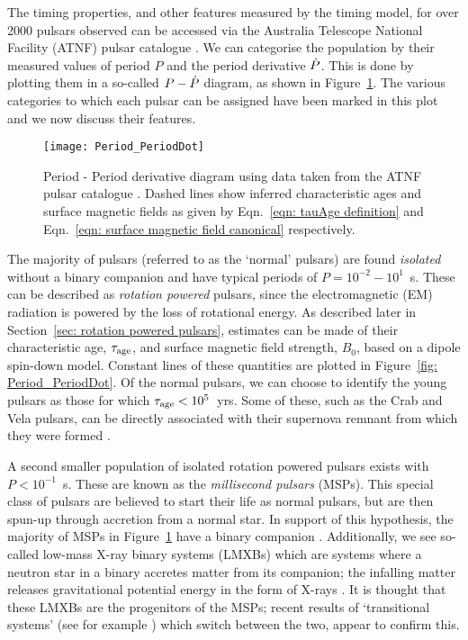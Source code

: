 The timing properties, and other features measured by the timing model, for
over 2000 pulsars observed can be accessed via the Australia Telescope National
Facility (ATNF) pulsar catalogue \citep{ATNF}.  We can categorise the
population by their measured values of period $P$ and the period derivative
$\dot{P}$. This is done by plotting them in a so-called $P - \dot{P}$ diagram, as
shown in Figure~\ref{fig: Period_PeriodDot}.  The various categories to which
each pulsar can be assigned have been marked in this plot and we now discuss
their features.

\begin{figure}[htb]
\centering
\texttt{[image: Period\_PeriodDot]} 
\caption{Period -
Period derivative diagram using data taken from the ATNF pulsar catalogue
\citep{ATNF}. Dashed lines show inferred characteristic ages and 
surface magnetic fields as given by Eqn.~\eqref{eqn: tauAge definition}
and Eqn.~\eqref{eqn: surface magnetic field canonical} respectively.}
\label{fig: Period_PeriodDot}
\end{figure}

The majority of pulsars (referred to as the `normal' pulsars) are found
\emph{isolated} without a binary companion and have typical periods of
$P=10^{-2}-10^{1}$~s. These can be described as \emph{rotation powered}
pulsars, since the electromagnetic (EM) radiation is powered by the loss of
rotational energy. As described later in Section~\ref{sec: rotation powered
pulsars}, estimates can be made of their characteristic age, $\tau_{\mathrm{age}}$, and
surface magnetic field strength, $B_{0}$, based on a dipole spin-down model.
Constant lines of these quantities are plotted in Figure~\ref{fig:
Period_PeriodDot}. Of the normal pulsars, we can choose to identify the young
pulsars as those for which $\tau_{\mathrm{age}}<10^{5}$~yrs. Some of these, such as the
Crab and Vela pulsars, can be directly associated with their supernova remnant
from which they were formed \citep{Kaspi1996}.

A second smaller population of isolated rotation powered pulsars exists with
$P<10^{-1}$~s. These are known as the \emph{millisecond pulsars} (MSPs). This
special class of pulsars are believed to start their life as normal pulsars,
but are then spun-up through accretion from a normal star. In support of this
hypothesis, the majority of MSPs in Figure~\ref{fig: Period_PeriodDot} have a
binary companion \citep{wijnands1998millisecond}. Additionally, we see so-called
low-mass X-ray binary systems (LMXBs) which are systems where a neutron star in
a binary accretes matter from its companion; the infalling matter releases
gravitational potential energy in the form of X-rays \citep{lewin1997x}. It is
thought that these LMXBs are the progenitors of the MSPs; recent results of
`transitional systems' (see for example \citep{archibald2009radio}) which
switch between the two, appear to confirm this.

